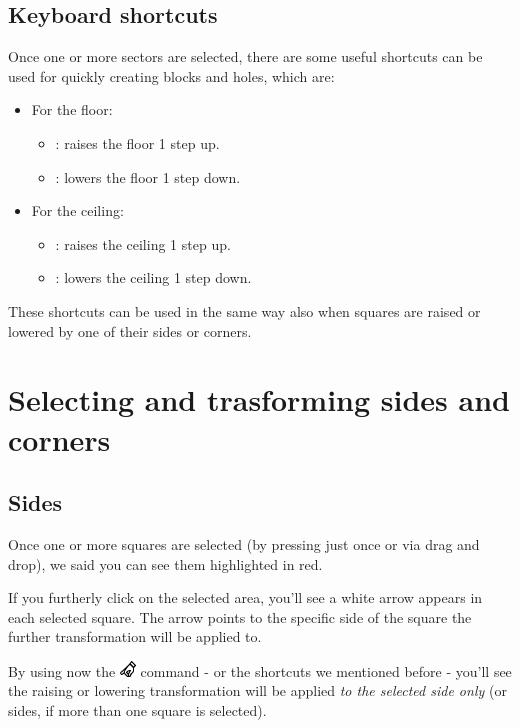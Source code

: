 \section{Keyboard shortcuts}
Once one or more sectors are selected, there are some useful shortcuts can be used for quickly creating blocks and holes, which are:
\begin{itemize}
    \item For the floor:
    \begin{itemize}
        \item {}: raises the floor 1 step up.
        \item {}: lowers the floor 1 step down.
    \end{itemize}
    \item For the ceiling:
    \begin{itemize}
        \item {}: raises the ceiling 1 step up.
        \item {}: lowers the ceiling 1 step down.
    \end{itemize}
\end{itemize}

These shortcuts can be used in the same way also when squares are raised or lowered by one of their sides or corners.

\chapter{Selecting and trasforming sides and corners}

\section{Sides}

Once one or more squares are selected (by pressing  just once or via drag and drop), we said you can see them highlighted in red.
\par If you furtherly click on the selected area, you'll see a white arrow appears in each selected square. The arrow points to the specific side of the square the further transformation will be applied to.
\par By using now the \includegraphics[scale=0.5]{Resources/icons_toolbox/toolbox_Drag-16.png} command - or the shortcuts  we mentioned before - you'll see the raising or lowering transformation will be applied \emph{to the selected side only} (or sides, if more than one square is selected).

